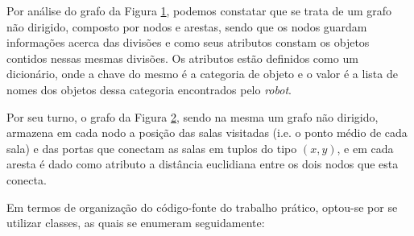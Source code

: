 \begin{figure}[!htb]
	\centering
	\caption{}{}
	\label{fig::grafo_floor}
\end{figure}

Por análise do grafo da Figura \ref{fig::grafo_floor}, podemos constatar que se trata de um grafo não dirigido, composto por nodos e arestas, sendo que os nodos guardam informações acerca das divisões e como seus atributos constam os objetos contidos nessas mesmas divisões. Os atributos estão definidos como um dicionário, onde a chave do mesmo é a categoria de objeto e o valor é a lista de nomes dos objetos dessa categoria encontrados pelo \emph{robot}.

\begin{figure}[!htb]
	\centering
	\caption{}{}
	\label{fig::grafo_map}
\end{figure}

Por seu turno, o grafo da Figura \ref{fig::grafo_map}, sendo na mesma um grafo não dirigido, armazena em cada nodo a posição das salas visitadas (i.e. o ponto médio de cada sala) e das portas que conectam as salas em tuplos do tipo $(x, y)$, e em cada aresta é dado como atributo a distância euclidiana entre os dois nodos que esta conecta.


Em termos de organização do código-fonte do trabalho prático, optou-se por se utilizar classes, as quais se enumeram seguidamente:

